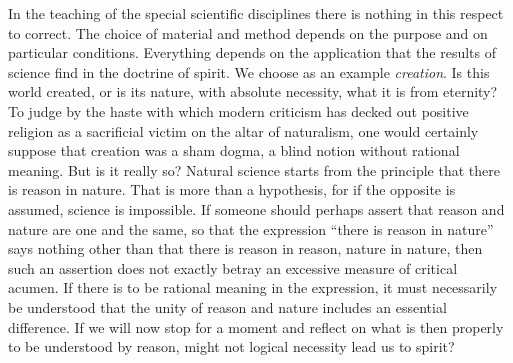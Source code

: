 \documentclass[12pt,a4paper,openany]{book}
\begin{document}
In the teaching of the special scientific disciplines there is nothing in
this respect to correct. The choice of material and method depends on
the purpose and on particular conditions. Everything depends on the
application that the results of science find in the doctrine of spirit.
We choose as an example \emph{creation}. Is this world created, or is its
nature, with absolute necessity, what it is from eternity? To judge by the
haste with which modern criticism has decked out positive religion as a
sacrificial victim on the altar of naturalism, one would certainly
suppose that creation was a sham dogma, a blind notion without rational
meaning. But is it really so? Natural science starts from the principle
that there is reason in nature. That is more than a hypothesis, for if
the opposite is assumed, science is impossible. If someone should perhaps
assert that reason and nature are one and the same, so that the
expression ``there is reason in nature'' says nothing other than that
there is reason in reason, nature in nature, then such an assertion does
not exactly betray an excessive measure of critical acumen. If there is
to be rational meaning in the expression, it must necessarily be
understood that the unity of reason and nature includes an essential
difference. If we will now stop for a moment and reflect on what is then
properly to be understood by reason, might not logical necessity lead us
to spirit?
\end{document}
